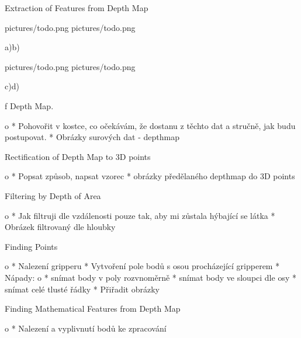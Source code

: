 
\sec Extraction of Features from Depth Map


\medskip {}
\picw=6cm 
\centerline {\inspic pictures/todo.png \hfil\hfil \inspic pictures/todo.png }\nobreak
\centerline {a)\hfil\hfil b)}\nobreak\medskip
\centerline {\inspic pictures/todo.png \hfil\hfil \inspic pictures/todo.png }\nobreak
\centerline {c)\hfil\hfil d)}\nobreak\medskip
\caption/f Depth Map.
\medskip


		\Green
		\begitems \style o
			* Pohovořit v kostce, co očekávám, že dostanu z těchto dat a stručně, jak budu postupovat.
			* Obrázky surových dat - depthmap
		\enditems
		\Black

\secc Rectification of Depth Map to 3D points

		\Green
		\begitems \style o
			* Popsat způsob, napsat vzorec
			* obrázky předělaného depthmap do 3D points
		\enditems
		\Black

\secc Filtering by Depth of Area

		\Green
		\begitems \style o
			* Jak filtruji dle vzdálenosti pouze tak, aby mi zůstala hýbající se látka
			* Obrázek filtrovaný dle hloubky
		\enditems
		\Black

\secc Finding Points

		\Green
		\begitems \style o
			* Nalezení gripperu
			* Vytvoření pole bodů s osou procházející gripperem
			* Nápady:
				\begitems \style o
				* snímat body v poly rozvnoměrně
				* snímat body ve sloupci dle osy
				* snímat celé tlusté řádky
				\enditems
			* Přiřadit obrázky
		\enditems
		\Black

\secc Finding Mathematical Features from Depth Map

		\Green
		\begitems \style o
			* Nalezení a vyplivnutí bodů ke zpracování
		\enditems
		\Black
